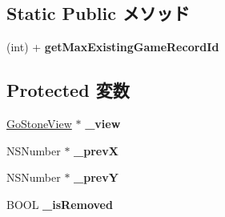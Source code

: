 \subsection*{Static Public メソッド}
\begin{DoxyCompactItemize}
\item 
\hypertarget{interface_game_records_accb605b564e94df4b5dcb75c31fc9efe}{
(int) + {\bfseries getMaxExistingGameRecordId}}
\label{interface_game_records_accb605b564e94df4b5dcb75c31fc9efe}

\end{DoxyCompactItemize}
\subsection*{Protected 変数}
\begin{DoxyCompactItemize}
\item 
\hypertarget{interface_game_records_a56a4096420569594b9b97b32d9b97eb6}{
\hyperlink{interface_go_stone_view}{GoStoneView} $\ast$ {\bfseries \_\-view}}
\label{interface_game_records_a56a4096420569594b9b97b32d9b97eb6}

\item 
\hypertarget{interface_game_records_ae44b9e95b767f8f37856f2a9850d3230}{
NSNumber $\ast$ {\bfseries \_\-prevX}}
\label{interface_game_records_ae44b9e95b767f8f37856f2a9850d3230}

\item 
\hypertarget{interface_game_records_a6e69938ce77ef8fef142559749b57a69}{
NSNumber $\ast$ {\bfseries \_\-prevY}}
\label{interface_game_records_a6e69938ce77ef8fef142559749b57a69}

\item 
\hypertarget{interface_game_records_ac4e5d6a5f8b55b2f64f4deba9a3d43ea}{
BOOL {\bfseries \_\-isRemoved}}
\label{interface_game_records_ac4e5d6a5f8b55b2f64f4deba9a3d43ea}

\end{DoxyCompactItemize}
